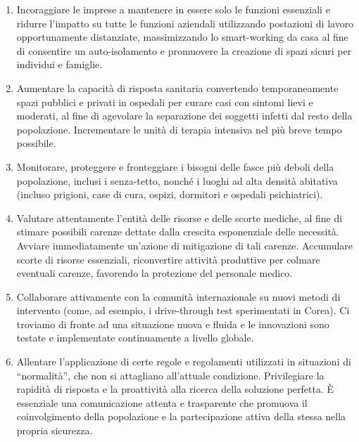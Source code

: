 \documentclass[onecolumn,journal]{IEEEtran}
\begin{document}
\begin{multicols}{2}
\begin{enumerate}
\item Incoraggiare le imprese a mantenere in essere solo le funzioni essenziali e ridurre l’impatto su tutte le funzioni aziendali utilizzando postazioni di lavoro opportunamente distanziate, massimizzando lo smart-working da casa al fine di consentire un auto-isolamento e promuovere la creazione di spazi sicuri per individui e famiglie.

\item Aumentare la capacità di risposta sanitaria convertendo temporaneamente spazi pubblici e privati in ospedali per curare casi con sintomi lievi e moderati, al fine di agevolare la separazione dei soggetti infetti dal resto della popolazione. Incrementare le unità di terapia intensiva nel più breve tempo possibile.

\item Monitorare, proteggere e fronteggiare i bisogni delle fasce più deboli della popolazione, inclusi i senza-tetto, nonché i luoghi ad alta densità abitativa (incluso prigioni, case di cura, ospizi, dormitori e ospedali psichiatrici).

\item  Valutare attentamente l’entità delle risorse e delle scorte mediche, al fine di stimare possibili carenze dettate dalla crescita esponenziale delle necessità. Avviare immediatamente un’azione di mitigazione di tali carenze. Accumulare scorte di risorse essenziali, riconvertire attività produttive per colmare eventuali carenze, favorendo la protezione del personale medico.

\item {Collaborare attivamente con la comunità internazionale su nuovi metodi di intervento (come, ad esempio, i drive-through test sperimentati in Corea). Ci troviamo di fronte ad una situazione nuova e fluida e le innovazioni sono testate e implementate continuamente a livello globale.}

\item Allentare l’applicazione di certe regole e regolamenti utilizzati in situazioni di “normalità”, che non si attagliano all’attuale condizione. Privilegiare la rapidità di risposta e la proattività alla ricerca della soluzione perfetta. È essenziale una comunicazione attenta e trasparente che promuova il coinvolgimento della popolazione e la partecipazione attiva della stessa nella propria sicurezza.


\end{enumerate}




\end{multicols}
\end{document}
